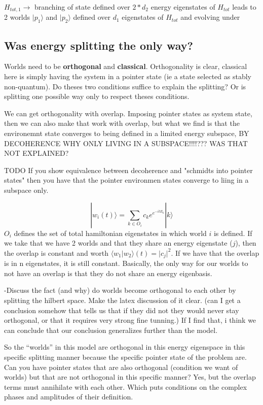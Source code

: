 \documentclass{article}
\begin{document}
$H_{tot,1}\rightarrow$ branching of state defined over $2*d_2$ energy eigenstates of $H_{tot}$ leads to 2 worlds $|p_1\rangle$ and $|p_2\rangle$  defined over $d_1$ eigenstates of $H_{tot}$ and evolving under 

\subsection{Was energy splitting the only way?}

Worlds need to be \textbf{orthogonal} and \textbf{classical}. Orthogonality is clear, classical here is simply having the system in a pointer state (ie a state selected as stably non-quantum). Do theses two conditions suffice to explain the splitting? Or is splitting one possible way only to respect theses conditions.

We can get orthogonality with overlap. 
Imposing pointer states as system state, then we can also make that work with overlap, but what we find is that the environemnt state converges to being defined in a limited energy subspace, BY DECOHERENCE 
WHY ONLY LIVING IN A SUBSPACE!!!!??? WAS THAT NOT EXPLAINED? 

TODO
If you show equivalence between decoherence and "schmidts into pointer states" then you have that the pointer environmen states converge to liing in a subspace only.

\begin{equation}
    |w_i(t)\rangle=\sum_{k\in O_i}c_ke^{e^{-itE_k}}|k\rangle
\end{equation}
$O_i$ defines the set of total hamiltonian eigenstates in which world $i$ is defined. If we take that we have 2 worlds and that they share an energy eigenstate ($j$), then the overlap is constant and worth $\langle w_1|w_2\rangle(t)=|c_j|^2$. If we have that the overlap is in n eigenstates, it is still constant. Basically, the only way for our worlds to not have an overlap is that they do not share an energy eigenbasis. 


-Discuss the fact (and why) do worlds become orthogonal to each other by splitting the hilbert space. Make the latex discussion of it clear.
(can I get a conclusion somehow that tells us that if they did not they would never stay orthogonal, or that it requires very strong fine tunning.) If I find that, i think we can conclude that our conclusion generalizes further than the model.

So the “worlds” in this model are orthogonal in this energy eigenspace in this specific splitting manner because the specific pointer state of the problem are. Can you have pointer states that are also orthogonal (condition we want of worlds) but that are not orthogonal in this specific manner? Yes, but the overlap terms must annihilate with each other. Which puts conditions on the complex phases and amplitudes of their definition. 
\end{document}
